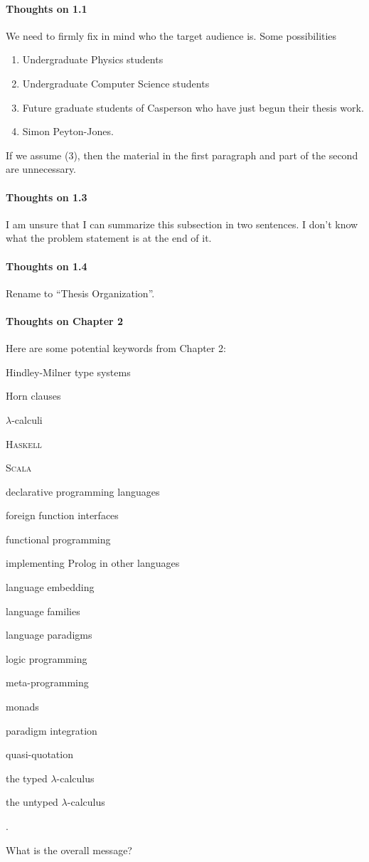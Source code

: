 \begin{scope}
\paragraph{Thoughts on 1.1}

We need to firmly fix in mind who the target audience is.  Some
possibilities
\begin{enumerate}
\item Undergraduate Physics students
\item Undergraduate Computer Science students
\item
  Future graduate students of Casperson who have just begun their
  thesis work.
\item
  Simon Peyton-Jones.
\end{enumerate}
If we assume (3), then the material in the first paragraph and part of
the second are unnecessary.

\paragraph{Thoughts on 1.3}

I am unsure that I can summarize this subsection in two sentences.  I
don't know what the problem statement is at the end of it.

\paragraph{Thoughts on 1.4}

Rename to ``Thesis Organization''.

\paragraph{Thoughts on Chapter 2}

Here are some potential keywords from Chapter 2:
\begin{inparaitem}
\item Hindley-Milner type systems
\item Horn clauses
\item \(\lambda\)-calculi
\item \textsc{Haskell}
\item \textsc{Scala}
\item declarative programming languages
\item foreign function interfaces
\item functional programming
\item implementing Prolog in other languages
\item language embedding
\item language families
\item language paradigms
\item logic programming
\item meta-programming
\item monads
\item paradigm integration
\item quasi-quotation
\item the typed \(\lambda\)-calculus
\item the untyped \(\lambda\)-calculus
\end{inparaitem}.

What is the overall message?


\end{scope}
